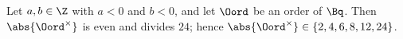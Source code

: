 Let $a,b\in\Z$ with $a<0$ and $b<0$, and let $\Oord$ be an order of $\Bq$. Then $\abs{\Oord^\times}$ is even and divides $24$; hence
$\abs{\Oord^\times}\in\{2,4,6,8,12,24\}$.
